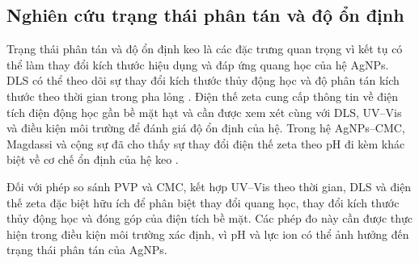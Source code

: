 \subsection{Nghiên cứu trạng thái phân tán và độ ổn định}
Trạng thái phân tán và độ ổn định keo là các đặc trưng quan trọng vì kết tụ có thể làm thay đổi kích thước hiệu dụng và đáp ứng quang học của hệ AgNPs.
DLS có thể theo dõi sự thay đổi kích thước thủy động học và độ phân tán kích thước theo thời gian trong pha lỏng \parencite{zhang2016}.
Điện thế zeta cung cấp thông tin về điện tích điện động học gần bề mặt hạt và cần được xem xét cùng với DLS, UV--Vis và điều kiện môi trường để đánh giá độ ổn định của hệ.
Trong hệ AgNPs--CMC, Magdassi và cộng sự đã cho thấy sự thay đổi điện thế zeta theo pH đi kèm khác biệt về cơ chế ổn định của hệ keo \parencite{magdassi2003}.
\par
Đối với phép so sánh PVP và CMC, kết hợp UV--Vis theo thời gian, DLS và điện thế zeta đặc biệt hữu ích để phân biệt thay đổi quang học, thay đổi kích thước thủy động học và đóng góp của điện tích bề mặt.
Các phép đo này cần được thực hiện trong điều kiện môi trường xác định, vì pH và lực ion có thể ảnh hưởng đến trạng thái phân tán của AgNPs.

